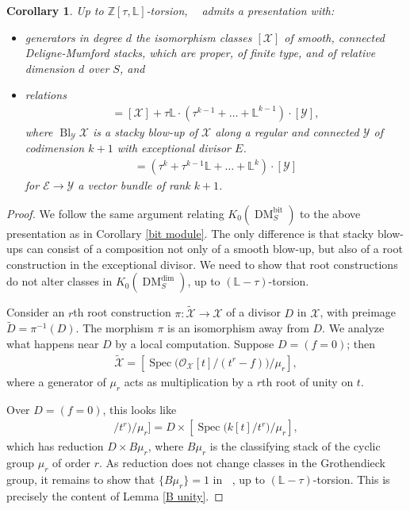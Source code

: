 \documentclass{amsart}
\newtheorem{cor}[thm]{Corollary}
\theoremstyle{definition}
\DeclareMathOperator{\Bl}{Bl}
\DeclareMathOperator{\DM}{DM}
\DeclareMathOperator{\bit}{bit}
\DeclareMathOperator{\Kdm}{K_0(\DM_k^{\dim})}
\DeclareMathOperator{\KdmS}{K_0(\DM_S^{\dim})}
\numberwithin{equation}{section}
\begin{document}
\begin{cor}
Up to $\mathbb{Z}[\tau, \mathbb{L}]$-torsion, $\KdmS$ admits a presentation with:
\begin{itemize}
    \item generators in degree $d$ the isomorphism classes $[\mathscr{X}]$ of smooth, connected Deligne-Mumford stacks, which are proper, of finite type, and of relative dimension $d$ over $S$, and
    \item relations
        \begin{align*}
            [\Bl_\mathscr{Y} \mathscr{X}] = [\mathscr{X}] +\tau \mathbb{L}\cdot (\tau^{k-1} + \ldots +\mathbb{L}^{k-1}) \cdot [\mathscr{Y}],
        \end{align*}
            where $\Bl_\mathscr{Y} \mathscr{X}$ is a stacky blow-up of $\mathscr{X}$ along a regular and connected $\mathscr{Y}$ of codimension $k+1$ with exceptional divisor $E$.
        \begin{align*}
            [\mathbb{P}(\mathscr{E})] = (\tau^{k}+ \tau^{k-1} \mathbb{L} +  \ldots + \mathbb{L}^{k}) \cdot [\mathscr{Y}]
        \end{align*} 
        for $\mathscr{E} \rightarrow \mathscr{Y}$ a vector bundle of rank $k+1$.
\end{itemize}
\end{cor}

\begin{proof}
We follow the same argument relating $K_0(\DM_S^{\bit})$ to the above presentation as in Corollary \ref{bit module}. The only difference is that stacky blow-ups can consist of a composition not only of a smooth blow-up, but also of a root construction in the exceptional divisor. We need to show that root constructions do not alter classes in $K_0(\DM_S^{\dim})$, up to $(\mathbb{L}-\tau)$-torsion.

Consider an $r$th root construction $\pi: \tilde{\mathscr{X}} \rightarrow \mathscr{X}$ of a divisor $D$ in $\mathscr{X}$, with preimage $\tilde{D} = \pi^{-1}(D)$. The morphism $\pi$ is an isomorphism away from $D$.  We analyze what happens near $D$ by a local computation. Suppose $D = (f=0)$; then
\begin{align*}
    \tilde{\mathscr{X}} = [\mathop{\mathrm{Spec}} \big( \mathscr{O}_\mathscr{X}[t]/(t^r - f) \big) / \mu_r ],
\end{align*}
where a generator of $\mu_r$ acts as multiplication by a $r$th root of unity on $t$.

Over $D = (f=0)$, this looks like
\begin{align*}
    [\mathop{\mathrm{Spec}} \big( \mathscr{O}_\mathscr{X}[t]/t^r \big) / \mu_r ] = D \times [\mathop{\mathrm{Spec}} \big( k[t]/t^r \big) / \mu_r],
\end{align*}
which has reduction $D \times B \mu_r$, where $B \mu_r$ is the classifying stack of the cyclic group $\mu_r$ of order $r$. As reduction does not change classes in the Grothendieck group, it remains to show that $\{ B \mu_r \} = 1$ in $\Kdm$, up to $(\mathbb{L}-\tau)$-torsion. This is precisely the content of Lemma \ref{B unity}.
\end{proof}
\end{document}
